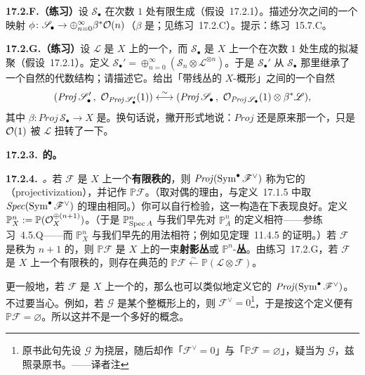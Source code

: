 \textbf{17.2.F.（练习）}\quad 设 $\mathscr{S}_\bullet$ 在次数 $1$ 处有限生成（\mbox{假设~17.2.1}）。描述分次\trQCSheaf{}之间的一个映射 $\phi\colon\mathscr{S}_\bullet\to\oplus_{n=0}^{\infty}\beta^*\mathcal{O}(n)$（$\beta$ 是\trStructureMorphism；见\mbox{练习~17.2.C}）。提示：\mbox{练习~15.7.C}。

\textbf{17.2.G.（练习）}\quad 设 $\mathscr{L}$ 是 $X$ 上的一个\trInvertibleSheaf，而 $\mathscr{S}_\bullet$ 是 $X$ 上一个在次数 $1$ 处生成的拟凝聚\trSheafOfGradedAlgebras（\mbox{假设~17.2.1}）。定义 $\mathscr{S}_\bullet'=\oplus_{n=0}^{\infty}(\mathscr{S}_n\otimes\mathscr{L}^{\otimes n})$。于是 $\mathscr{S}_\bullet'$ 从 $\mathscr{S}_\bullet$ 那里继承了一个自然的代数结构；请描述它。给出「带线丛的 $X$-概形」之间的一个自然\trIsomorphism
\[
(\mathit{Proj}\,\mathscr{S}_\bullet'\,,\ \OO_{\mathit{Proj}\,\mathscr{S}_\bullet'}(1))\overset{\sim}{\longleftrightarrow}(\mathit{Proj}\,\mathscr{S}_\bullet\,,\ \OO_{\mathit{Proj}\,\mathscr{S}_\bullet}(1)\otimes\beta^*\mathscr{L}),
\]
其中 $\beta\colon\mathit{Proj}\,\mathscr{S}_\bullet\to X$ 是\trStructureMorphism。换句话说，撇开形式地说：$\mathit{Proj}$ 还是原来那一个，只是 $\mathcal{O}(1)$ 被 $\mathscr{L}$ 扭转了一下。

\textbf{17.2.3.}\ \textbf{\trVectorBundle{}的\trProjectivization。}

\textbf{17.2.4.}\ \emph{\trhDefinition。}\quad 若 $\mathscr{F}$ 是 $X$ 上一个\textbf{有限秩的\trLocallyFreeSheaf}，则 $\mathit{Proj}(\operatorname{Sym}^\bullet\mathscr{F}^\vee)$ 称为它的\textbf{\trProjectivization}（projectivization），并记作 $\mathbb{P}\mathscr{F}$。（取对偶的理由，与\mbox{定义~17.1.5} 中取 $\mathit{Spec}(\operatorname{Sym}^\bullet\mathscr{F}^\vee)$ 的理由相同。）你可以自行检验，这一构造在\trBaseChange{}下表现良好。定义 $\mathbb{P}^n_X:=\mathbb{P}(\mathcal{O}_X^{\oplus(n+1)})$。（于是 $\mathbb{P}^n_{\operatorname{Spec} A}$ 与我们早先对 $\mathbb{P}^n_A$ 的定义相符——参\mbox{练习~4.5.Q}——而 $\mathbb{P}^n_X$ 与我们早先的用法相符；例如见\mbox{定理~11.4.5} 的证明。）若 $\mathscr{F}$ 是秩为 $n+1$ 的\trLocallyFreeSheaf，则 $\mathbb{P}\mathscr{F}$ 是 $X$ 上的一束\textbf{射影丛}或 $\mathbb{P}^n$-\textbf{丛}。由\mbox{练习~17.2.G}，若 $\mathscr{F}$ 是 $X$ 上一个有限秩的\trLocallyFreeSheaf，则存在典范的\trIsomorphism{} $\mathbb{P}\mathscr{F}\overset{\sim}{\longleftarrow}\mathbb{P}(\mathscr{L}\otimes\mathscr{F})$。

更一般地，若 $\mathscr{F}$ 是 $X$ 上一个\trFiniteType{}的\trQCSheaf，那么也可以类似地定义它的\trProjectivization{} $\mathit{Proj}(\operatorname{Sym}^\bullet\mathscr{F}^\vee)$。不过要当心。例如，若 $\mathscr{G}$ 是某个整概形上的\trTorsion\trSheaf，则 $\mathscr{F}^\vee=0$\footnote{原书此句先设 $\mathscr{G}$ 为挠层，随后却作「$\mathscr{F}^\vee=0$」与「$\mathbb{P}\mathscr{F}=\varnothing$」，疑当为 $\mathscr{G}$，兹照录原书。——译者注}，于是按这个定义便有 $\mathbb{P}\mathscr{F}=\varnothing$。所以这并不是一个多好的概念。


